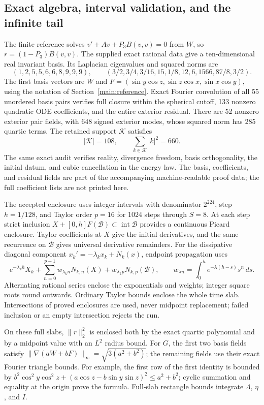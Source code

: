 \subsection{Exact algebra, interval validation, and the infinite tail}
\label{n3:certificate}

The finite reference solves $v'+Av+P_3B(v,v)=0$ from $W$, so
$r=(1-P_3)B(v,v)$. The supplied exact rational data give a ten-dimensional
real invariant basis. Its Laplacian eigenvalues and squared norms are
\[
 (1,2,5,5,6,6,8,9,9,9),\qquad
 (3/2,3/4,3/16,15,1/8,12,6,1566,87/8,3/2).
\]
The first basis vectors are $W$ and
$F=(\sin y\cos z,\sin z\cos x,\sin x\cos y)$, using the notation of Section~\ref{main:reference}.
Exact Fourier convolution of all 55 unordered basis pairs verifies full
closure within the spherical cutoff, 133 nonzero quadratic ODE
coefficients, and the entire exterior residual. There are 52 nonzero
exterior pair fields, with 648 signed exterior modes, whose squared norm
has 285 quartic terms. The retained support $\mathcal K$ satisfies
\begin{equation}
 |\mathcal K|=108,
 \qquad\sum_{k\in\mathcal K}|k|^2=660.
 \label{n3:support}
\end{equation}
The same exact audit verifies reality, divergence freedom, basis
orthogonality, the initial datum, and cubic cancellation in the energy law.
The basis, coefficients, and residual fields are part of the accompanying
machine-readable proof data; the full coefficient lists are not printed here.

The accepted enclosure uses integer intervals with denominator $2^{224}$,
step $h=1/128$, and Taylor order $p=16$ for 1024 steps through $S=8$.
At each step strict inclusion
$X+[0,h]F(\mathcal B)\subset\operatorname{int}\mathcal B$
provides a continuous Picard enclosure. Taylor coefficients at $X$ give
the initial derivatives, and the same recurrence on $\mathcal B$ gives
universal derivative remainders. For the dissipative diagonal component
$x_k'=-\lambda_kx_k+N_k(x)$, endpoint propagation uses
\[
 e^{-\lambda_kh}X_k+\sum_{n=0}^{p-1}w_{\lambda_kn}N_{k,n}(X)
       +w_{\lambda_kp}N_{k,p}(\mathcal B),\qquad
 w_{\lambda n}=\int_0^h e^{-\lambda(h-s)}s^n\,ds.
\]
Alternating rational series enclose the exponentials and weights; integer
square roots round outwards. Ordinary Taylor bounds enclose the whole
time slab. Intersections of proved enclosures are used, never midpoint
replacement; failed inclusion or an empty intersection rejects the run.

On these full slabs, $\|r\|_2^2$ is enclosed both by the exact quartic
polynomial and by a midpoint value with an $L^2$ radius bound. For $G$, the
first two basis fields satisfy
$\|\nabla(aW+bF)\|_\infty=\sqrt{3(a^2+b^2)}$; the remaining fields
use their exact Fourier triangle bounds. For example, the first row of
the first identity is bounded by
$b^2\cos^2y\cos^2z+(a\cos z-b\sin y\sin z)^2\le a^2+b^2$;
cyclic summation and equality at the origin prove the formula.
Full-slab rectangle bounds integrate $\Lambda$, $\eta$, and $I$.

